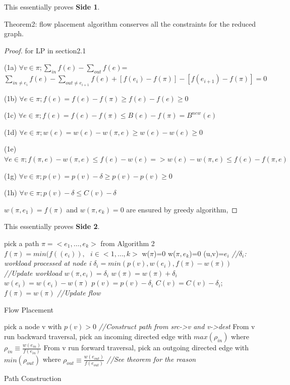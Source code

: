 \documentclass{sig-alternate}
\begin{document}
This essentially proves \textbf{Side 1}.

Theorem2: flow placement algorithm conserves all the constraints for the reduced graph.

\begin{proof} for LP in section2.1 \newline

(1a)
$\forall v \in \pi; \sum\limits_{in}  f(e) - \sum\limits_{out} f(e)$=
$\sum\limits_{in \not=e_i}  f(e) - \sum\limits_{out\not=e_{i+1} } f(e) +[f(e_i)-f(\pi) ] - [f(e_{i+1}) -f(\pi)] = 0 $

(1b)
$ \forall e \in \pi; f(e) = f(e)-f(\pi) \geq f(e)-f(e) \geq 0$

(1c)
$\forall e \in \pi; f(e) = f(e)-f(\pi) \leq B(e)-f(\pi)=B^{new}(e)$

(1d)
$\forall e \in \pi; w(e) = w(e) - w(\pi, e) \geq w(e) -w(e) \geq 0$

(1e)
$\forall e \in\pi; f(\pi, e)-w(\pi, e) \leq f(e) -w(e) =>w(e) -w(\pi, e) \leq f(e) -f(\pi, e) $

(1g)
$\forall v \in \pi; p(v) = p(v) -\delta \geq p(v) -p(v) \geq 0 $

(1h)
$\forall v \in \pi; p(v) - \delta \leq C(v) - \delta $

$w(\pi, e_1) = f(\pi) $ and $w(\pi, e_k)=0$ are ensured by greedy algorithm, 
\end{proof}
This essentially proves \textbf{Side 2}.


\begin{algorithm}\label {Flow Placement}
\SetAlgoLined
\BlankLine
{}
{

pick a path $\pi = <e_1, \dots, e_k> $ from Algorithm 2\;
 	$f(\pi) = min( f((e_i) ), \text{ } i\in <1,\dots,k>$\;
	\BlankLine
	w($\pi$)=0\;
	w($\pi, e_k$)=0\;
	\BlankLine
	{
	(u,v)=$e_i$\;
	\emph{//$\delta_i$: workload processed at node i}\;
	$\delta_i = min( p(v), w(e_{i}) , f(\pi) -w(\pi))$\;
	\emph{//Update workload}\;
	$w(\pi, e_i) =\delta_i$\;
	$ w(\pi)= w(\pi)+ \delta_i$\;
	$w(e_i) = w(e_i)- w(\pi)$\;
	$p(v) = p(v)-\delta_i$\;
	$C(v) = C(v) - \delta_i$;
	}
	\BlankLine
	$f(\pi) = w(\pi) $
	\BlankLine
	\emph{//Update flow}\;
	
}
\caption{Flow Placement}
\end{algorithm}

\begin{algorithm}\label {Path Construction}
\SetAlgoLined
\BlankLine
pick a node v with $p(v)>0$\;
\emph{//Construct path from src->v and v->dest}\;
From v run backward traversal, pick an incoming directed edge with $ max( \rho_{in} )  $ where $\rho_{in} \equiv \frac{ w(e_{in})}{f(e_{in})}$\;
From v run forward traversal, pick an outgoing directed edge with $ min(\rho_{out} ) $ where $\rho_{out} \equiv \frac{ w(e_{out})}{f(e_{out})} $\;
\emph{//See theorem for the reason}\;
\caption{ Path Construction}
\end{algorithm}
\end{document}
